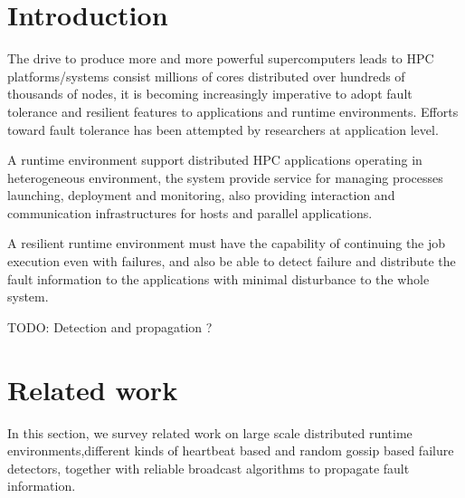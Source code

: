 \documentclass[sigconf]{acmart}
\begin{document}

%

%
\maketitle

\section{Introduction}
The drive to produce more and more powerful supercomputers leads to HPC platforms/systems consist millions of cores distributed over hundreds of thousands of nodes, it is becoming increasingly imperative to adopt fault tolerance and resilient features to applications and runtime environments. Efforts toward fault tolerance has been attempted by researchers at application level. 

A runtime environment support distributed HPC applications operating in heterogeneous environment, the system provide service for managing processes launching, deployment and monitoring, also providing interaction and communication infrastructures for hosts and parallel applications. 

A resilient runtime environment must have the capability of continuing the job execution even with failures, and also be able to detect failure and distribute the fault information to the applications with minimal disturbance to the whole system.  

TODO:
Detection and propagation ?

\section{Related work}
In this section, we survey related work on large scale distributed runtime environments,different kinds of heartbeat based and random gossip based failure detectors, together with reliable broadcast algorithms to propagate fault information.
\end{document}
